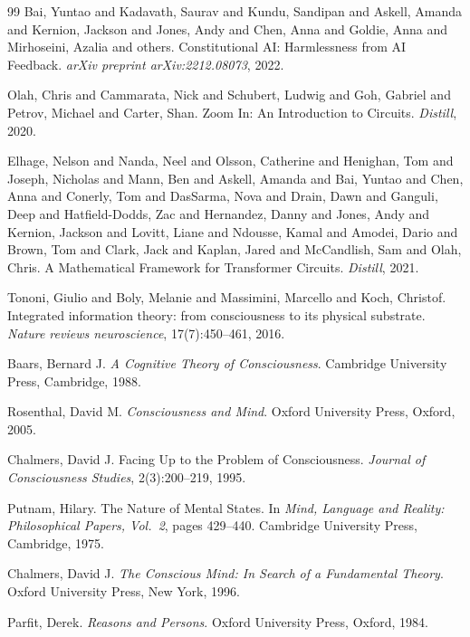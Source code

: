 \documentclass[12pt]{article}
\begin{document}
\begin{thebibliography}{99}
Bai, Yuntao and Kadavath, Saurav and Kundu, Sandipan and Askell, Amanda and Kernion, Jackson and Jones, Andy and Chen, Anna and Goldie, Anna and Mirhoseini, Azalia and others.
Constitutional {AI}: Harmlessness from {AI} Feedback.
\textit{arXiv preprint arXiv:2212.08073}, 2022.

Olah, Chris and Cammarata, Nick and Schubert, Ludwig and Goh, Gabriel and Petrov, Michael and Carter, Shan.
Zoom In: An Introduction to Circuits.
\textit{Distill}, 2020.

Elhage, Nelson and Nanda, Neel and Olsson, Catherine and Henighan, Tom and Joseph, Nicholas and Mann, Ben and Askell, Amanda and Bai, Yuntao and Chen, Anna and Conerly, Tom and DasSarma, Nova and Drain, Dawn and Ganguli, Deep and Hatfield-Dodds, Zac and Hernandez, Danny and Jones, Andy and Kernion, Jackson and Lovitt, Liane and Ndousse, Kamal and Amodei, Dario and Brown, Tom and Clark, Jack and Kaplan, Jared and McCandlish, Sam and Olah, Chris.
A Mathematical Framework for Transformer Circuits.
\textit{Distill}, 2021.

Tononi, Giulio and Boly, Melanie and Massimini, Marcello and Koch, Christof.
Integrated information theory: from consciousness to its physical substrate.
\textit{Nature reviews neuroscience}, 17(7):450--461, 2016.

Baars, Bernard J.
\textit{A Cognitive Theory of Consciousness}.
Cambridge University Press, Cambridge, 1988.

Rosenthal, David M.
\textit{Consciousness and Mind}.
Oxford University Press, Oxford, 2005.

Chalmers, David J.
Facing Up to the Problem of Consciousness.
\textit{Journal of Consciousness Studies}, 2(3):200--219, 1995.

Putnam, Hilary.
The Nature of Mental States.
In \textit{Mind, Language and Reality: Philosophical Papers, Vol.~2}, pages 429--440.
Cambridge University Press, Cambridge, 1975.

Chalmers, David J.
\textit{The Conscious Mind: In Search of a Fundamental Theory}.
Oxford University Press, New York, 1996.

Parfit, Derek.
\textit{Reasons and Persons}.
Oxford University Press, Oxford, 1984.

\end{thebibliography}
\end{document}
